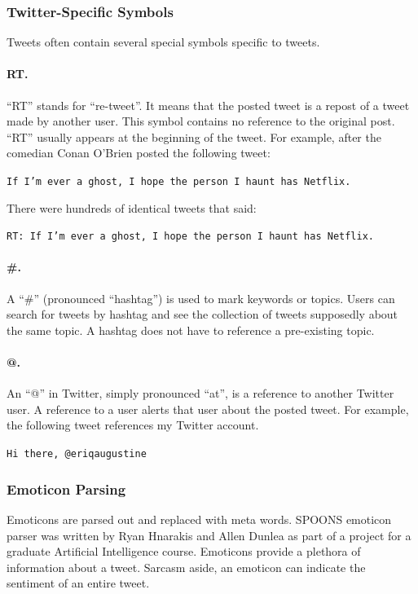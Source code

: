\documentclass[12pt]{ucthesis}
\begin{document}
\subsubsection{Twitter-Specific Symbols}
\label{class-filter-twitter-symbols}
Tweets often contain several special symbols specific to tweets.

\paragraph{RT.}
\label{class-twitter-symbols-rt}
``RT'' stands for ``re-tweet''. It means that the posted tweet is a repost of
a tweet made by another user. This symbol contains no reference to the original post.
``RT'' usually appears at the beginning of the tweet. For example, after the comedian
Conan O'Brien posted the following tweet:

\begin{center}
   \texttt{If I'm ever a ghost, I hope the person I haunt has Netflix.}
\end{center}

There were hundreds of identical tweets that said:

\begin{center}
   \texttt{RT: If I'm ever a ghost, I hope the person I haunt has Netflix.}
\end{center}

\paragraph{\#.}
\label{class-twitter-symbols-hash}
A ``\#'' (pronounced ``hashtag'') is used to mark keywords or topics.
Users can search for tweets by hashtag and see the collection of tweets supposedly about the
same topic. A hashtag does not have to reference a pre-existing topic.

\paragraph{@.}
\label{class-twitter-symbols-at}
An ``@'' in Twitter, simply pronounced ``at'', is a reference to another Twitter user.
A reference to a user alerts that user about the posted tweet.
For example, the following tweet references my Twitter account.

\begin{center}
   \texttt{Hi there, @eriqaugustine}
\end{center}

\subsubsection{Emoticon Parsing}
\label{class-filter-emoticon}
Emoticons are parsed out and replaced with meta words.
SPOONS emoticon parser was written by Ryan Hnarakis and Allen Dunlea as part of a project for a graduate Artificial Intelligence course.
Emoticons provide a plethora of information about a tweet. Sarcasm aside,
an emoticon can indicate the sentiment of an entire tweet.
\end{document}
